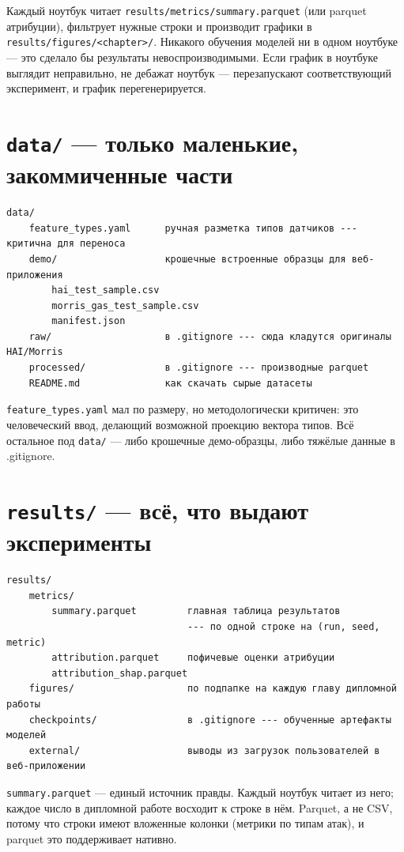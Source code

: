 \documentclass[11pt,a4paper]{article}
\newcommand{\code}[1]{\texttt{#1}}
\begin{document}
Каждый ноутбук читает \code{results/metrics/summary.parquet} (или parquet атрибуции), фильтрует нужные строки и производит графики в \code{results/figures/<chapter>/}. Никакого обучения моделей ни в одном ноутбуке --- это сделало бы результаты невоспроизводимыми. Если график в ноутбуке выглядит неправильно, не дебажат ноутбук --- перезапускают соответствующий эксперимент, и график перегенерируется.

\section{\texttt{data/} --- только маленькие, закоммиченные части}

\begin{Verbatim}
data/
    feature_types.yaml      ручная разметка типов датчиков --- критична для переноса
    demo/                   крошечные встроенные образцы для веб-приложения
        hai_test_sample.csv
        morris_gas_test_sample.csv
        manifest.json
    raw/                    в .gitignore --- сюда кладутся оригиналы HAI/Morris
    processed/              в .gitignore --- производные parquet
    README.md               как скачать сырые датасеты
\end{Verbatim}

\code{feature\_types.yaml} мал по размеру, но методологически критичен: это человеческий ввод, делающий возможной проекцию вектора типов. Всё остальное под \code{data/} --- либо крошечные демо-образцы, либо тяжёлые данные в .gitignore.

\section{\texttt{results/} --- всё, что выдают эксперименты}

\begin{Verbatim}
results/
    metrics/
        summary.parquet         главная таблица результатов
                                --- по одной строке на (run, seed, metric)
        attribution.parquet     пофичевые оценки атрибуции
        attribution_shap.parquet
    figures/                    по подпапке на каждую главу дипломной работы
    checkpoints/                в .gitignore --- обученные артефакты моделей
    external/                   выводы из загрузок пользователей в веб-приложении
\end{Verbatim}

\code{summary.parquet} --- единый источник правды. Каждый ноутбук читает из него; каждое число в дипломной работе восходит к строке в нём. Parquet, а не CSV, потому что строки имеют вложенные колонки (метрики по типам атак), и parquet это поддерживает нативно.
\end{document}
